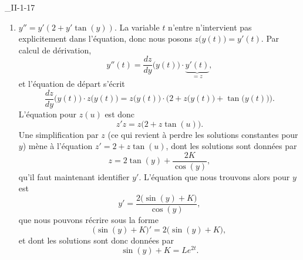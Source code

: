 \begin{corrige}{_II-1-17}
\begin{enumerate}
\item
$y''=y'(2+y'\tan(y))$. La variable $t$ n'entre n'intervient pas explicitement dans l'équation, donc nous posons $z\big( y(t) \big)=y'(t)$. Par calcul de dérivation,
\begin{equation}
	y''(t)=\frac{ dz }{ dy }\big( y(t) \big)\cdot \underbrace{y'(t)}_{=z},
\end{equation}
et l'équation de départ s'écrit
\begin{equation}
	\frac{ dz }{ dy }\big( y(t) \big)\cdot z\big( y(t) \big)=z\big( y(t) \big)\cdot\Big( 2+z\big( y(t) \big)+\tan\big( y(t) \big) \Big).
\end{equation}
L'équation pour $z(u)$ est donc
\begin{equation}
	z'z=z\big( 2+z\tan(u) \big).
\end{equation}
Une simplification par $z$ (ce qui revient à perdre les solutions constantes pour $y$) mène à l'équation $z'=2+z\tan(u)$, dont les solutions sont données par
\begin{equation}
	z=2\tan(y)+\frac{ 2K }{ \cos(y) },
\end{equation}
qu'il faut maintenant identifier $y'$. L'équation que nous trouvons alors pour $y$ est
\begin{equation}
	y'=\frac{ 2\big( \sin(y)+K \big) }{ \cos(y) },
\end{equation}
que nous pouvons récrire sous la forme
\begin{equation}
	\big( \sin(y)+K \big)'=2\big( \sin(y)+K \big),
\end{equation}
et dont les solutions sont donc données par
\begin{equation}
	\sin(y)+K=L e^{2t}.
\end{equation}


\end{enumerate}
\end{corrige}
